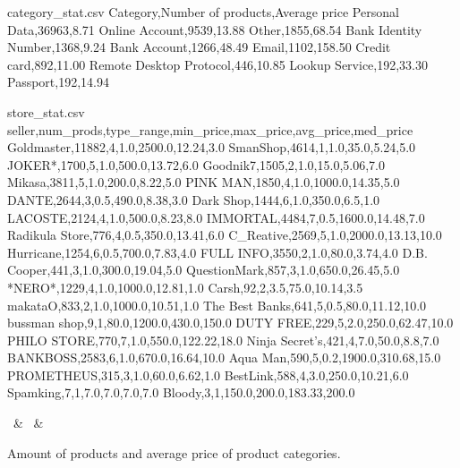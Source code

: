 \begin{filecontents*}[overwrite]{category_stat.csv}
    Category,Number of products,Average price
    Personal Data,36963,8.71
    Online Account,9539,13.88
    Other,1855,68.54
    Bank Identity Number,1368,9.24
    Bank Account,1266,48.49
    Email,1102,158.50
    Credit card,892,11.00
    Remote Desktop Protocol,446,10.85
    Lookup Service,192,33.30
    Passport,192,14.94
\end{filecontents*}

\begin{filecontents*}[overwrite]{store_stat.csv}
seller,num_prods,type_range,min_price,max_price,avg_price,med_price
Goldmaster,11882,4,1.0,2500.0,12.24,3.0
SmanShop,4614,1,1.0,35.0,5.24,5.0
JOKER*,1700,5,1.0,500.0,13.72,6.0
Goodnik7,1505,2,1.0,15.0,5.06,7.0
Mikasa,3811,5,1.0,200.0,8.22,5.0
PINK MAN,1850,4,1.0,1000.0,14.35,5.0
DANTE,2644,3,0.5,490.0,8.38,3.0
Dark Shop,1444,6,1.0,350.0,6.5,1.0
LACOSTE,2124,4,1.0,500.0,8.23,8.0
IMMORTAL,4484,7,0.5,1600.0,14.48,7.0
Radikula Store,776,4,0.5,350.0,13.41,6.0
C_Reative,2569,5,1.0,2000.0,13.13,10.0
Hurricane,1254,6,0.5,700.0,7.83,4.0
FULL INFO,3550,2,1.0,80.0,3.74,4.0
D.B. Cooper,441,3,1.0,300.0,19.04,5.0
QuestionMark,857,3,1.0,650.0,26.45,5.0
*NERO*,1229,4,1.0,1000.0,12.81,1.0
Carsh,92,2,3.5,75.0,10.14,3.5
makataO,833,2,1.0,1000.0,10.51,1.0
The Best Banks,641,5,0.5,80.0,11.12,10.0
bussman shop,9,1,80.0,1200.0,430.0,150.0
DUTY FREE,229,5,2.0,250.0,62.47,10.0
PHILO STORE,770,7,1.0,550.0,122.22,18.0
Ninja Secret's,421,4,7.0,50.0,8.8,7.0
BANKBOSS,2583,6,1.0,670.0,16.64,10.0
Aqua Man,590,5,0.2,1900.0,310.68,15.0
PROMETHEUS,315,3,1.0,60.0,6.62,1.0
BestLink,588,4,3.0,250.0,10.21,6.0
Spamking,7,1,7.0,7.0,7.0,7.0
Bloody,3,1,150.0,200.0,183.33,200.0
\end{filecontents*}

\begin{table*}[]
    \centering
    {\cate\ & \amount\ & \avg}%
    \caption{Amount of products and average price of product categories.}\label{tab:category_stat}
\end{table*}


